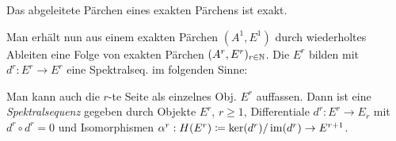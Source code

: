 \documentclass{cheat-sheet}
\begin{document}
\begin{lem}
  Das abgeleitete Pärchen eines exakten Pärchens ist exakt.
\end{lem}

\begin{bem}
  Man erhält nun aus einem exakten Pärchen $(A^1, E^1)$ durch wiederholtes Ableiten eine Folge von exakten Pärchen $(A^r, E^r)_{r \in \mathbb{N}}$. Die $E^r$ bilden mit $d^r \!:\! E^r \!\to\! E^r$ eine Spektralseq. im folgenden Sinne:
\end{bem}

\begin{bem}
  Man kann auch die $r$-te Seite als einzelnes Obj. $E^r$ auffassen. Dann ist eine \emph{Spektralsequenz} gegeben durch Objekte $E^r$, $r \geq 1$, Differentiale $d^r : E^r \to E_r$ mit $d^r \circ d^r = 0$ und Isomorphismen $\alpha^r : H(E^r) \coloneqq \ker(d^r) / \operatorname{im}(d^r) \to E^{r+1}$.
\end{bem}
\end{document}
